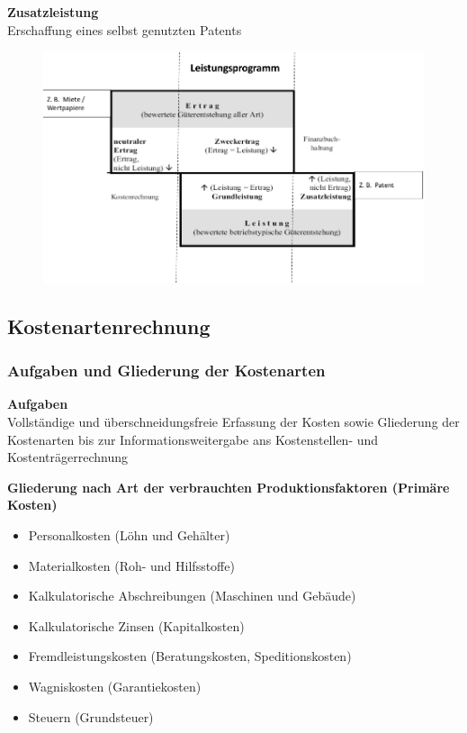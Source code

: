 \documentclass[a4paper,11pt, twoside]{article}
\begin{document}
\textbf{Zusatzleistung}\\
Erschaffung eines selbst genutzten Patents

\begin{figure}[h]
 \begin{center}
   \includegraphics[scale=0.3]{bilder/leistungsprogramm2.png}
 \end{center}
\end{figure}

\subsection{Kostenartenrechnung}

\subsubsection*{Aufgaben und Gliederung der Kostenarten}

\textbf{Aufgaben}\\
Vollständige und überschneidungsfreie Erfassung der Kosten sowie Gliederung der Kostenarten bis zur Informationsweitergabe ans Kostenstellen- und Kostenträgerrechnung 

\textbf{Gliederung nach Art der verbrauchten Produktionsfaktoren (Primäre Kosten)}
\begin{itemize}
	\item Personalkosten (Löhn und Gehälter)
	\item Materialkosten (Roh- und Hilfsstoffe)
	\item Kalkulatorische Abschreibungen (Maschinen und Gebäude)
	\item Kalkulatorische Zinsen (Kapitalkosten)
	\item Fremdleistungskosten (Beratungskosten, Speditionskosten)
	\item Wagniskosten (Garantiekosten)
	\item Steuern (Grundsteuer)
\end{itemize}
\end{document}
